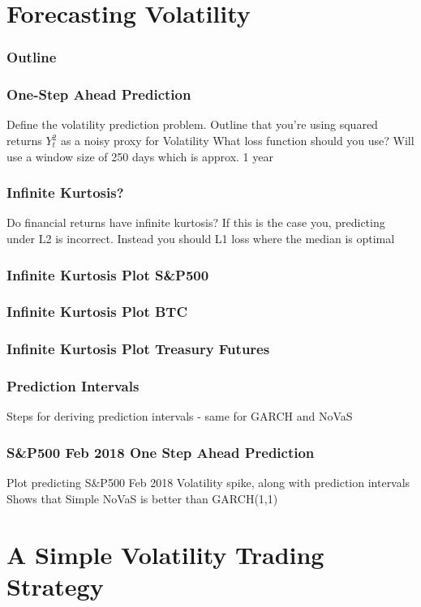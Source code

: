 \documentclass{beamer}
\begin{document}
\section{Forecasting Volatility}

\begin{frame}
\frametitle{Outline}
\tableofcontents[currentsection]
\end{frame}

\begin{frame}
\frametitle{One-Step Ahead Prediction}
Define the volatility prediction problem.
Outline that you're using squared returns $Y_{t}^2$ as a noisy proxy for Volatility
What loss function should you use?
Will use a window size of 250 days which is approx. 1 year
\end{frame}

\begin{frame}
\frametitle{Infinite Kurtosis?}
Do financial returns have infinite kurtosis?
If this is the case you, predicting under L2 is incorrect. Instead you should L1 loss where the median is optimal
\end{frame}

\begin{frame}
\frametitle{Infinite Kurtosis Plot S&P500}

\end{frame}

\begin{frame}
\frametitle{Infinite Kurtosis Plot BTC}

\end{frame}

\begin{frame}
\frametitle{Infinite Kurtosis Plot Treasury Futures}

\end{frame}

\begin{frame}
\frametitle{Prediction Intervals}
Steps for deriving prediction intervals - same for GARCH and NoVaS
\end{frame}

\begin{frame}
\frametitle{S&P500 Feb 2018 One Step Ahead Prediction}
Plot predicting S&P500 Feb 2018 Volatility spike, along with prediction intervals
Shows that Simple NoVaS is better than GARCH(1,1)
\end{frame}

\section{A Simple Volatility Trading Strategy}
\end{document}
